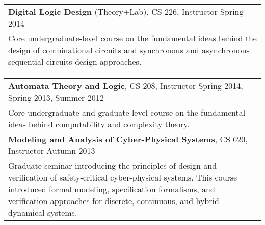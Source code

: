 \documentclass{article}
\begin{document}
\vspace{-1em}
\begin{center}
  \begin{tabular}{ p{16.5cm}}
{\bf Digital Logic Design} (Theory+Lab), CS 226, Instructor \hfill Spring 2014 \\[3pt]
\hspace{2em}  Core undergraduate-level course on the fundamental ideas behind
the design of combinational circuits and synchronous and asynchronous sequential
circuits design approaches.  \\ [6pt]
%
  \end{tabular}
  \begin{tabular}{ p{16.5cm}}
{\bf Automata Theory and Logic}, CS 208, Instructor \hfill Spring 2014, Spring
2013, Summer 2012 \\[3pt]
\hspace{2em}  Core undergraduate and graduate-level course on the fundamental
ideas behind computability and complexity theory.\\ [6pt] 
%
{\bf Modeling and Analysis of Cyber-Physical Systems}, CS 620, Instructor
\hfill Autumn 2013 \\[3pt]
\hspace{2em}  Graduate seminar introducing the principles of design and
verification of safety-critical cyber-physical systems. This course introduced
formal modeling, specification formalisms, and verification approaches for
discrete, continuous, and hybrid dynamical systems. \\ [6pt]
\end{tabular}
\end{center}
\end{document}
